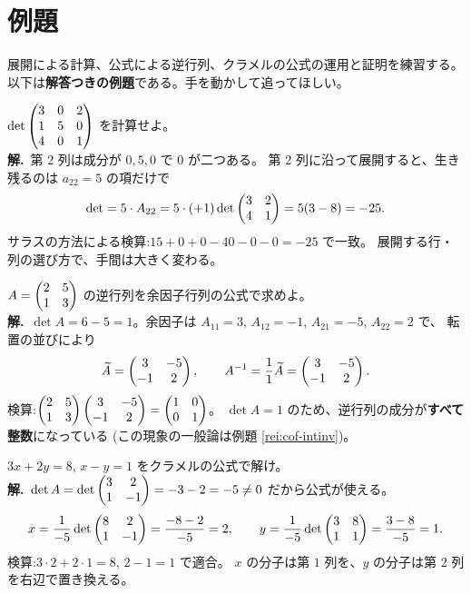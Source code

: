 \section{例題}

展開による計算、公式による逆行列、クラメルの公式の運用と証明を練習する。
以下は\textbf{解答つきの例題}である。手を動かして追ってほしい。

\begin{rei}[例題・基本($0$ の多い列に沿う展開)]\label{rei:cof-zerocol}
$\det \begin{pmatrix}3 & 0 & 2 \\ 1 & 5 & 0 \\ 4 & 0 & 1\end{pmatrix}$ を計算せよ。\\
\textbf{解.}\ 第 $2$ 列は成分が $0, 5, 0$ で $0$ が二つある。
第 $2$ 列に沿って展開すると、生き残るのは $a_{22} = 5$ の項だけで
\[
\det = 5 \cdot A_{22} = 5 \cdot (+1) \det \begin{pmatrix}3 & 2 \\ 4 & 1\end{pmatrix}
= 5 (3 - 8) = -25.
\]
サラスの方法による検算:$15 + 0 + 0 - 40 - 0 - 0 = -25$ で一致。
展開する行・列の選び方で、手間は大きく変わる。
\end{rei}

\begin{rei}[例題・基本($2$ 次の逆行列と整数性)]\label{rei:cof-inv2}
$A = \begin{pmatrix}2 & 5 \\ 1 & 3\end{pmatrix}$ の逆行列を余因子行列の公式で求めよ。\\
\textbf{解.}\ $\det A = 6 - 5 = 1$。余因子は
$A_{11} = 3$, $A_{12} = -1$, $A_{21} = -5$, $A_{22} = 2$ で、
転置の並びにより
\[
\widetilde{A} = \begin{pmatrix}3 & -5 \\ -1 & 2\end{pmatrix}, \qquad
A^{-1} = \frac{1}{1}\widetilde{A} = \begin{pmatrix}3 & -5 \\ -1 & 2\end{pmatrix}.
\]
検算:$\begin{pmatrix}2 & 5 \\ 1 & 3\end{pmatrix}\begin{pmatrix}3 & -5 \\ -1 & 2\end{pmatrix} = \begin{pmatrix}1 & 0 \\ 0 & 1\end{pmatrix}$。
$\det A = 1$ のため、逆行列の成分が\textbf{すべて整数}になっている
(この現象の一般論は例題 \ref{rei:cof-intinv})。
\end{rei}

\begin{rei}[例題・基本(クラメルの公式・$2$ 元)]\label{rei:cof-cramer2}
$3x + 2y = 8$, $x - y = 1$ をクラメルの公式で解け。\\
\textbf{解.}\ $\det A = \det \begin{pmatrix}3 & 2 \\ 1 & -1\end{pmatrix} = -3 - 2 = -5 \neq 0$
だから公式が使える。
\[
x = \frac{1}{-5}\det \begin{pmatrix}8 & 2 \\ 1 & -1\end{pmatrix} = \frac{-8 - 2}{-5} = 2, \qquad
y = \frac{1}{-5}\det \begin{pmatrix}3 & 8 \\ 1 & 1\end{pmatrix} = \frac{3 - 8}{-5} = 1.
\]
検算:$3 \cdot 2 + 2 \cdot 1 = 8$, $2 - 1 = 1$ で適合。
$x$ の分子は第 $1$ 列を、$y$ の分子は第 $2$ 列を右辺で置き換える。
\end{rei}

